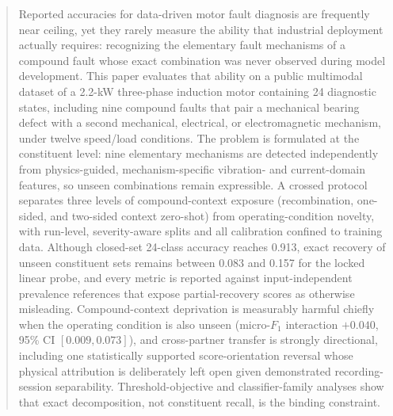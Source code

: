 %
%

\begin{abstract}
Reported accuracies for data-driven motor fault diagnosis are frequently near
ceiling, yet they rarely measure the ability that industrial deployment
actually requires: recognizing the elementary fault mechanisms of a compound
fault whose exact combination was never observed during model development.
This paper evaluates that ability on a public multimodal dataset of a 2.2-kW
three-phase induction motor containing 24 diagnostic states, including nine
compound faults that pair a mechanical bearing defect with a second
mechanical, electrical, or electromagnetic mechanism, under twelve speed/load
conditions. The problem is formulated at the constituent level: nine
elementary mechanisms are detected independently from physics-guided,
mechanism-specific vibration- and current-domain features, so unseen
combinations remain expressible. A crossed protocol separates three levels of
compound-context exposure (recombination, one-sided, and two-sided
context zero-shot) from operating-condition novelty, with run-level,
severity-aware splits and all calibration confined to training data. Although
closed-set 24-class accuracy reaches 0.913, exact recovery of unseen
constituent sets remains between 0.083 and 0.157 for the locked linear probe,
and every metric is reported against input-independent prevalence references
that expose partial-recovery scores as otherwise misleading. Compound-context
deprivation is measurably harmful chiefly when the operating condition is
also unseen (micro-$F_1$ interaction $+0.040$, 95\% CI $[0.009, 0.073]$), and
cross-partner transfer is strongly directional, including one statistically
supported score-orientation reversal whose physical attribution is
deliberately left open given demonstrated recording-session separability.
Threshold-objective and classifier-family analyses show that exact
decomposition, not constituent recall, is the binding constraint.
\end{abstract}

